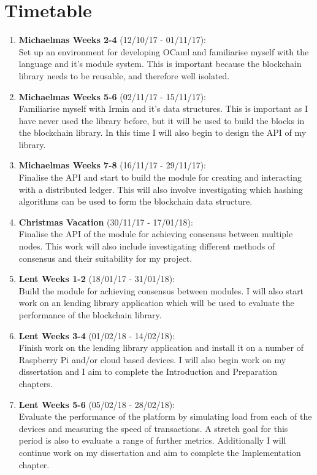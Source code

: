 \documentclass[12pt, letterpaper, twoside]{article}
\begin{document}
	\section*{Timetable}
	\begin{enumerate}
		\item \textbf{Michaelmas Weeks 2-4} (12/10/17 - 01/11/17):\\
		Set up an environment for developing OCaml and familiarise myself with the language and it's module system. This is important because the blockchain library needs to be reusable, and therefore well isolated.
		\item \textbf{Michaelmas Weeks 5-6}  (02/11/17 - 15/11/17):\\
		Familiarise myself with Irmin and it's data structures. This is important as I have never used the library before, but it will be used to build the blocks in the blockchain library. In this time I will also begin to design the API of my library.
		\item \textbf{Michaelmas Weeks 7-8} (16/11/17 - 29/11/17):\\
		Finalise the API and start to build the module for creating and interacting with a distributed ledger. This will also involve investigating which hashing algorithms can be used to form the blockchain data structure.
		\item \textbf{Christmas Vacation} (30/11/17 - 17/01/18):\\
		Finalise the API of the module for achieving consensus between multiple nodes. This work will also include investigating different methods of consensus and their suitability for my project.
		\item \textbf{Lent Weeks 1-2} (18/01/17 - 31/01/18):\\
		Build the module for achieving consensus between modules. I will also start work on an lending library application which will be used to evaluate the performance of the blockchain library. 
		\item \textbf{Lent Weeks 3-4} (01/02/18 - 14/02/18):
		\\
		Finish work on the lending library application and install it on a number of Raspberry Pi and/or cloud based devices. I will also begin work on my dissertation and I aim to complete the Introduction and Preparation chapters.
		\item \textbf{Lent Weeks 5-6} (05/02/18 - 28/02/18):\\
		Evaluate the performance of the platform by simulating load from each of the devices and measuring the speed of transactions. A stretch goal for this period is also to evaluate a range of further metrics. Additionally I will continue work on my dissertation and aim to complete the Implementation chapter.

\end{enumerate}
\end{document}
